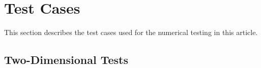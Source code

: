 \documentclass[11pt,a4paper]{article}
\begin{document}


\section{Test Cases} \label{sec:test_appendix}

This section describes the test cases used for the numerical testing in this article. 

\subsection{Two-Dimensional Tests}
\end{document}
